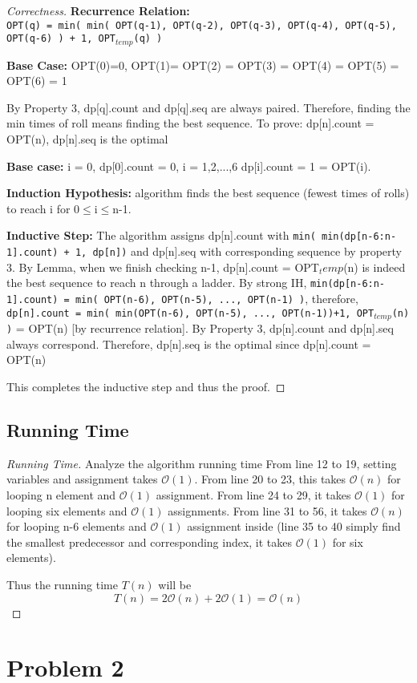 \documentclass[openany]{article}
\begin{document}
\begin{proof}[Correctness]{}
\textbf{Recurrence Relation:} \texttt{\\OPT(q) = min( min( OPT(q-1), OPT(q-2), OPT(q-3), OPT(q-4), OPT(q-5), OPT(q-6) ) + 1, OPT$_{temp}$(q) )}

\textbf{Base Case:} OPT(0)=0, OPT(1)= OPT(2) = OPT(3) = OPT(4) = OPT(5) = OPT(6) = 1

By Property 3, dp[q].count and dp[q].seq are always paired. Therefore, finding the min times of roll means finding the best sequence. To prove: dp[n].count = OPT(n), dp[n].seq is the optimal

\textbf{Base case:} i = 0, dp[0].count = 0, i = 1,2,...,6 dp[i].count = 1 = OPT(i).

\textbf{Induction Hypothesis:} algorithm finds the best sequence (fewest times of rolls) to reach i for 0$\leq$i$\leq$n-1.

\textbf{Inductive Step:} The algorithm assigns dp[n].count with \texttt{min( min(dp[n-6:n-1].count) + 1, dp[n])} and dp[n].seq with corresponding sequence by property 3. By Lemma, when we finish checking n-1, dp[n].count = OPT${_temp}$(n) is indeed the best sequence to reach n through a ladder. By strong IH, \texttt{min(dp[n-6:n-1].count) = min( OPT(n-6), OPT(n-5), ..., OPT(n-1) )}, therefore, \texttt{dp[n].count = min( min(OPT(n-6), OPT(n-5), ..., OPT(n-1))+1, OPT$_{temp}$(n) )} = OPT(n) [by recurrence relation]. By Property 3, dp[n].count and dp[n].seq always correspond. Therefore, dp[n].seq is the optimal since dp[n].count = OPT(n)

This completes the inductive step and thus the proof.

\end{proof}

\subsection*{Running Time}
\begin{proof}[Running Time]{Analyze the algorithm running time}
    	\renewcommand{\qedsymbol}{}
    	From line 12 to 19, setting variables and assignment takes $\mathcal{O}(1)$. From line 20 to 23, this takes $\mathcal{O}(n)$ for looping n element and $\mathcal{O}(1)$ assignment. From line 24 to 29, it takes $\mathcal{O}(1)$ for looping six elements and $\mathcal{O}(1)$ assignments. From line 31 to 56, it takes $\mathcal{O}(n)$ for looping n-6 elements and $\mathcal{O}(1)$ assignment inside (line 35 to 40 simply find the smallest predecessor and corresponding index, it takes $\mathcal{O}(1)$ for six elements).
    	
    	Thus the running time $T(n)$ will be \[T(n)=2\mathcal{O}(n)+2\mathcal{O}(1)=\mathcal{O}(n)\]
\end{proof}

\section*{Problem 2}





\end{document}
